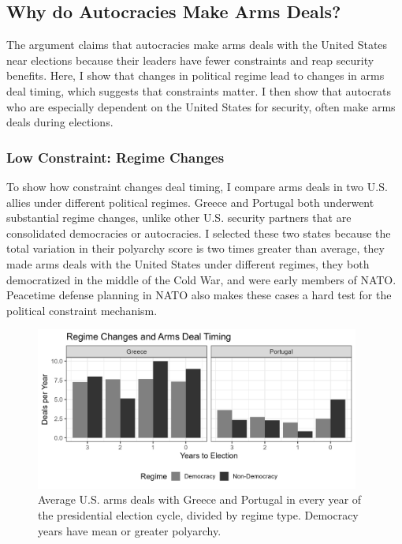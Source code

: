 \documentclass[12pt]{article}
\begin{document}
\subsection{Why do Autocracies Make Arms Deals?}


The argument claims that autocracies make arms deals with the United States near elections because their leaders have fewer constraints and reap security benefits. 
Here, I show that changes in political regime lead to changes in arms deal timing, which suggests that constraints matter. 
I then show that autocrats who are especially dependent on the United States for security, often make arms deals during elections.


\subsubsection{Low Constraint: Regime Changes}


To show how constraint changes deal timing, I compare arms deals in two U.S. allies under different political regimes. 
Greece and Portugal both underwent substantial regime changes, unlike other U.S. security partners that are consolidated democracies or autocracies. 
I selected these two states because the total variation in their polyarchy score is two times greater than average, they made arms deals with the United States under different regimes, they both democratized in the middle of the Cold War, and were early members of NATO. 
Peacetime defense planning in NATO also makes these cases a hard test for the political constraint mechanism.


\begin{figure}[htpb]
	\centering
		\includegraphics[width=0.95\textwidth]{../figures/deals-regime-change.png}
	\caption{Average U.S. arms deals with Greece and Portugal in every year of the presidential election cycle, divided by regime type. Democracy years have mean or greater polyarchy.}
	\label{fig:deals-regime-change}
\end{figure}
\end{document}
